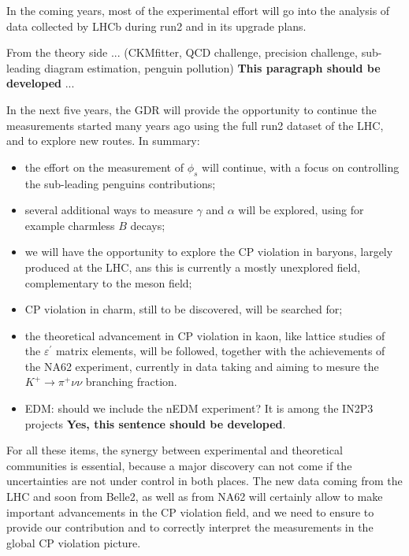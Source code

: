 
In the coming years, most of the experimental effort will go into the analysis of data collected by  LHCb during run2 and in its
upgrade plans. 


From the theory side ... (CKMfitter, QCD challenge, precision challenge,
sub-leading diagram estimation, penguin pollution) {\bf This paragraph should be developed} ...

In the next five years, the GDR   will provide the opportunity to continue the
measurements started many years ago using the full run2 dataset of the LHC,
and to explore new routes. In summary:

\begin{itemize}
\item the effort on the measurement of $\phi_{s}$ will continue, with a focus on controlling the sub-leading penguins contributions;
\item several additional ways to measure $\gamma$ and $\alpha$ will be explored, using for example charmless $B$ decays;
\item we will have the opportunity to explore the CP violation in baryons, largely produced at the LHC, ans this is currently a mostly unexplored field, complementary to the meson field;
\item CP violation in charm,  still to be discovered, will be searched for;
\item the theoretical advancement in CP violation in kaon, like  lattice studies of the $\varepsilon^{\prime}$ matrix elements, will be followed, together with the achievements of the  NA62 experiment, currently in data taking and aiming to mesure the  $K^{+}%
\rightarrow\pi^{+}\nu\nu$ branching fraction.
\item EDM: should we include the nEDM experiment? It is among the IN2P3 projects {\bf Yes, this sentence should be developed}.
\end{itemize}

For all these items, the synergy between experimental and theoretical communities is essential, because a major discovery can not come if the uncertainties are not under control in both places. The new data coming from the LHC and soon from Belle2, as well as from NA62 will certainly allow to make important advancements in the CP violation field, and we need to ensure to provide our contribution and to correctly interpret the measurements in the global CP violation picture. 

